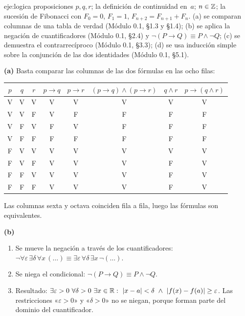 \begin{solucion}{eje:logica}
\datos proposiciones $p,q,r$; la definición de continuidad en~$a$; $n\in\mathbb{Z}$; la sucesión de Fibonacci con $F_0=0$, $F_1=1$, $F_{n+2}=F_{n+1}+F_n$.
\planteamiento (a) se comparan columnas de una tabla de verdad (Módulo 0.1, §1.3 y §1.4); (b) se aplica la negación de cuantificadores (Módulo 0.1, §2.4) y $\neg(P\to Q)\equiv P\wedge\neg Q$; (c) se demuestra el contrarrecíproco (Módulo 0.1, §3.3); (d) se usa inducción simple sobre la conjunción de las dos identidades (Módulo 0.1, §5.1).
\pasos

\noindent\textbf{(a)} Basta comparar las columnas de las dos fórmulas en las ocho filas:
\begin{center}\small
\begin{tabular}{@{}ccc|cc|c|c|c@{}}
\toprule
$p$ & $q$ & $r$ & $p\to q$ & $p\to r$ & $(p\to q)\wedge(p\to r)$ & $q\wedge r$ & $p\to(q\wedge r)$ \\
\midrule
V & V & V & V & V & V & V & V \\
V & V & F & V & F & F & F & F \\
V & F & V & F & V & F & F & F \\
V & F & F & F & F & F & F & F \\
F & V & V & V & V & V & V & V \\
F & V & F & V & V & V & F & V \\
F & F & V & V & V & V & F & V \\
F & F & F & V & V & V & F & V \\
\bottomrule
\end{tabular}
\end{center}
Las columnas sexta y octava coinciden fila a fila, luego las fórmulas son equivalentes.

\noindent\textbf{(b)}
\begin{enumerate}[label=\arabic*.]
  \item Se mueve la negación a través de los cuantificadores: $\neg\forall\varepsilon\,\exists\delta\,\forall x\,(\dots)\equiv\exists\varepsilon\,\forall\delta\,\exists x\,\neg(\dots)$.
  \item Se niega el condicional: $\neg(P\to Q)\equiv P\wedge\neg Q$.
  \item Resultado: $\exists\varepsilon>0\ \forall\delta>0\ \exists x\in\R:\ \abs{x-a}<\delta\ \wedge\ \abs{f(x)-f(a)}\ge\varepsilon$. Las restricciones «$\varepsilon>0$» y «$\delta>0$» no se niegan, porque forman parte del dominio del cuantificador.
\end{enumerate}


\end{solucion}
